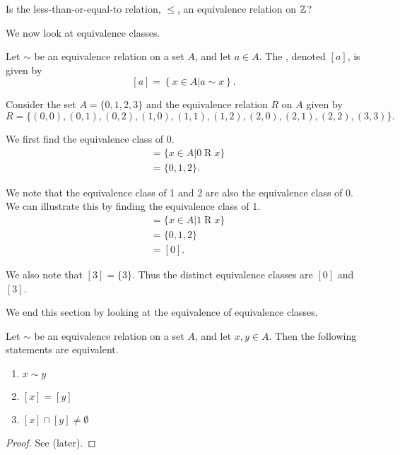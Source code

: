 \begin{exercise}
    Is the less-than-or-equal-to relation, $\leq$, an equivalence relation on $\mathbb{Z}$?
\end{exercise}

We now look at equivalence classes.
\begin{definition}
    Let $\sim$ be an equivalence relation on a set $A$, and let $a \in A$. The , denoted $[a]$, is given by
    \[
        [a] = \left\{x \in A \vert a\mathrel{\sim}x\right\}.
    \]
\end{definition}

\begin{example}
    Consider the set $A = \{0, 1, 2, 3\}$ and the equivalence relation $R$ on $A$ given by
    \[
        R = \{(0, 0), (0, 1), (0, 2), (1, 0), (1, 1), (1, 2), (2, 0), (2, 1), (2, 2), (3, 3)\}.
    \]

    We first find the equivalence class of 0.
    \begin{align*}
        [0] &= \{x \in A \vert 0 \mathrel{R} x\}\\
        &= \{0, 1, 2\}.
    \end{align*}

    We note that the equivalence class of 1 and 2 are also the equivalence class of 0. We can illustrate this by finding the equivalence class of 1.
    \begin{align*}
        [1] &= \{x \in A \vert 1 \mathrel{R} x\}\\
        &= \{0, 1, 2\}\\
        &= [0].
    \end{align*}

    We also note that $[3] = \{3\}$. Thus the distinct equivalence classes are $[0]$ and $[3]$.
\end{example}

We end this section by looking at the equivalence of equivalence classes.
\begin{theorem}\label{thrm-equivalence-class-equivalence}
    Let $\sim$ be an equivalence relation on a set $A$, and let $x, y \in A$. Then the following statements are equivalent.
    \begin{enumerate}
        \item $x \mathrel{\sim} y$
        \item $[x] = [y]$
        \item $[x] \cap [y] \neq \emptyset$
    \end{enumerate}
\end{theorem}
\begin{proof}
    See  (later).
\end{proof}

